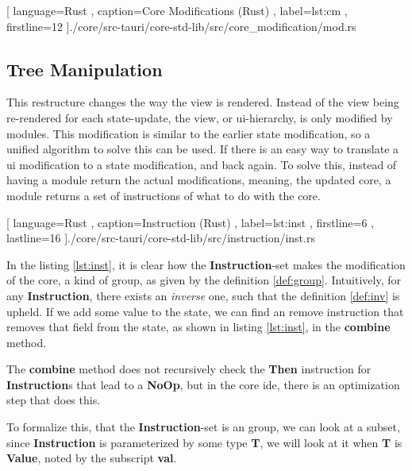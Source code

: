 \begin{center}
  
    [ language=Rust
    , caption={Core Modifications (Rust)}
    , label=lst:cm
    , firstline=12
    ]{./core/src-tauri/core-std-lib/src/core_modification/mod.rs}
\end{center}

\subsection{Tree Manipulation}

This restructure changes the way the view is rendered. Instead of the view being
re-rendered for each state-update, the view, or \gls{ui}-hierarchy, is only
modified by modules. This modification is similar to the earlier state
modification, so a unified algorithm to solve this can be used. If there is an
easy way to translate a \gls{ui} modification to a state modification, and back
again. To solve this, instead of having a module return the actual
modifications, meaning, the updated core, a module returns a set of instructions
of what to do with the core.

\begin{center}
  
   [ language=Rust
   , caption={Instruction (Rust)}
   , label=lst:inst
   , firstline=6
   , lastline=16
   ]{./core/src-tauri/core-std-lib/src/instruction/inst.rs}
\end{center}

In the listing \ref{lst:inst}, it is clear how the \textbf{Instruction}-set makes the
modification of the core, a kind of group, as given by the definition
\ref{def:group}. Intuitively, for any \textbf{Instruction}, there exists
an \textit{inverse} one, such that the definition \ref{def:inv} is upheld. If we
add some value to the state, we can find an remove instruction that removes
that field from the state, as shown in listing \ref{lst:inst}, in the
\textbf{combine} method.

\begin{remark}
  The \textbf{combine} method does not recursively check the \textbf{Then}
  instruction for \textbf{Instruction}s that lead to a \textbf{NoOp}, but in the
  core \gls{ide}, there is an optimization step that does this.
\end{remark}

To formalize this, that the \textbf{Instruction}-set is an group, we can look at
a subset, since \textbf{Instruction} is parameterized by some type \textbf{T},
we will look at it when \textbf{T} is \textbf{Value}, noted by the subscript
\textbf{val}.


